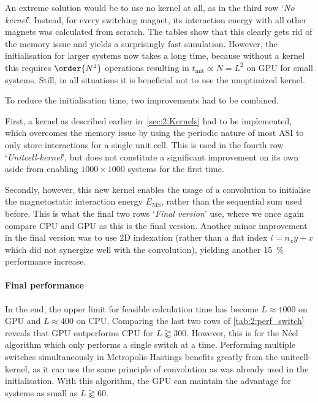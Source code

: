 An extreme solution would be to use no kernel at all, as in the third row `\textit{No kernel}'.
Instead, for every switching magnet, its interaction energy with all other magnets was calculated from scratch.
The tables show that this clearly gets rid of the memory issue and yields a surprisingly fast simulation.
However, the initialisation for larger systems now takes a long time, because without a kernel this requires $\order{N^2}$ operations resulting in $t_\mathrm{init} \propto N=L^2$ on GPU for small systems.
Still, in all situations it is beneficial not to use the unoptimized kernel. \\\par

To reduce the initialisation time, two improvements had to be combined. \par
First, a kernel as described earlier in~\cref{sec:2:Kernels} had to be implemented, which overcomes the memory issue by using the periodic nature of most ASI to only store interactions for a single unit cell.
This is used in the fourth row `\textit{Unitcell-kernel}', but does not constitute a significant improvement on its own aside from enabling $1000 \times 1000$ systems for the first time. \par
Secondly, however, this new kernel enables the usage of a convolution to initialise the magnetostatic interaction energy $E_\mathrm{MS}$, rather than the sequential sum used before.
This is what the final two rows `\textit{Final version}' use, where we once again compare CPU and GPU as this is the final version.
Another minor improvement in the final version was to use 2D indexation (rather than a flat index $i = n_x y + x$ which did not synergize well with the convolution), yielding another \SI{15}{\percent} performance increase.

\paragraph{Final performance}
In the end, the upper limit for feasible calculation time has become $L \approx 1000$ on GPU and $L \approx 400$ on CPU.
Comparing the last two rows of \cref{tab:2:perf_switch} reveals that GPU outperforms CPU for $L \gtrapprox 300$.
However, this is for the N\'eel algorithm which only performs a single switch at a time.
Performing multiple switches simultaneously in Metropolis-Hastings benefits greatly from the unitcell-kernel, as it can use the same principle of convolution as was already used in the initialisation.
With this algorithm, the GPU can maintain the advantage for systems as small as $L \gtrapprox 60$.

